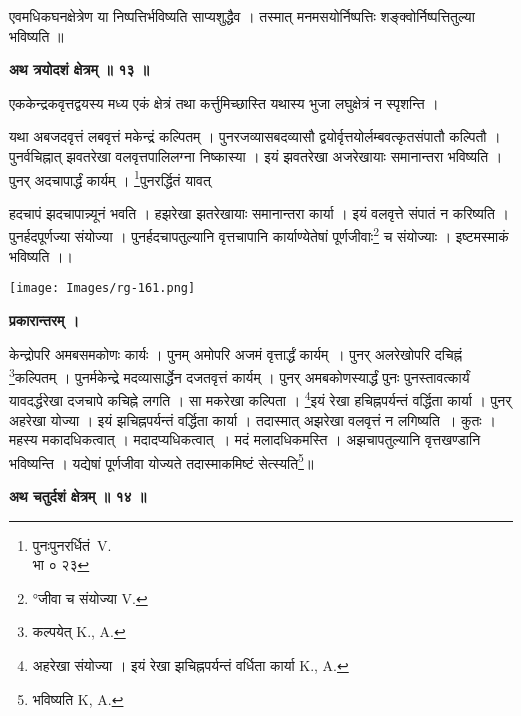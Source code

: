 \documentclass[11pt, openany]{book}
\begin{document}
एवमधिकघनक्षेत्रेण या निष्पत्तिर्भविष्यति साप्यशुद्धैव । तस्मात्
मनमसयोर्निष्पत्तिः शङ्क्वोर्निष्पत्तितुल्या भविष्यति ॥ \\
\vspace{3mm}

\begin{center}
\textbf{\large अथ त्रयोदशं क्षेत्रम् ॥ १३ ॥ }
\end{center}
\vspace{5mm}

{\ab एककेन्द्रकवृत्तद्वयस्य मध्य एकं क्षेत्रं तथा कर्त्तुमिच्छास्ति यथास्य भुजा लघुक्षेत्रं न स्पृशन्ति । }\\
\vspace{5mm}

 यथा अबजदवृत्तं लबवृत्तं मकेन्द्रं कल्पितम् । पुनरजव्यासबदव्यासौ द्वयोर्वृत्तयोर्लम्बवत्कृतसंपातौ कल्पितौ । पुनर्वचिह्नात् झवतरेखा वलवृत्तपालिलग्ना निष्कास्या । इयं झवतरेखा अजरेखायाः
समानान्तरा भविष्यति । पुनर् अदचापार्द्धं कार्यम् । \renewcommand{\thefootnote}{३}\footnote{पुनःपुनरर्धितं~{\en V.}\\
 भा ० २३}पुनरर्द्धितं यावत् 

\newpage
\noindent हदचापं झदचापान्न्यूनं भवति । हझरेखा झतरेखायाः समानान्तरा कार्या । इयं वलवृत्ते संपातं न करिष्यति । पुनर्हदपूर्णज्या संयोज्या । पुनर्हदचापतुल्यानि वृत्तचापानि कार्याण्येतेषां पूर्णजीवाः\renewcommand{\thefootnote}{१}\footnote{°जीवा च संयोज्या {\en V.}} च
संयोज्याः । इष्टमस्माकं भविष्यति ।। \\
\begin{center}
\texttt{[image: Images/rg-161.png]}  
\end{center}
\vspace{5mm}

\begin{center}
\textbf{प्रकारान्तरम् । }
\end{center}
\vspace{2mm}

 केन्द्रोपरि अमबसमकोणः कार्यः । पुनम् अमोपरि अजमं वृत्तार्द्धं कार्यम्~। पुनर् अलरेखोपरि दचिह्नं \renewcommand{\thefootnote}{२}\footnote{कल्पयेत् {\en K., A.} }कल्पितम् । पुनर्मकेन्द्रे मदव्यासार्द्धेन दजतवृत्तं कार्यम् । पुनर् अमबकोणस्यार्द्धं पुनः
पुनस्तावत्कार्यं यावदर्द्धरेखा दजचापे कचिह्ने लगति । सा मकरेखा कल्पिता । \renewcommand{\thefootnote}{३}\footnote{अहरेखा संयोज्या । इयं रेखा झचिह्नपर्यन्तं वर्धिता कार्या {\en K., A.}}इयं रेखा हचिह्नपर्यन्तं वर्द्धिता कार्या । पुनर् अहरेखा योज्या । इयं झचिह्नपर्यन्तं वर्द्धिता कार्या । तदास्मात् अझरेखा वलवृत्तं न लगिष्यति~। कुतः । महस्य मकादधिकत्वात् । मदादप्यधिकत्वात्~। मदं मलादधिकमस्ति । अझचापतुल्यानि वृत्तखण्डानि भविष्यन्ति । यद्येषां पूर्णजीवा योज्यते तदास्माकमिष्टं सेत्स्यति\renewcommand{\thefootnote}{४}\footnote{भविष्यति {\en K, A.}}॥\\ 
\begin{center}
\textbf{\large अथ चतुर्दशं क्षेत्रम् ॥ १४ ॥ }
\end{center}
\vspace{5mm}
\end{document}
